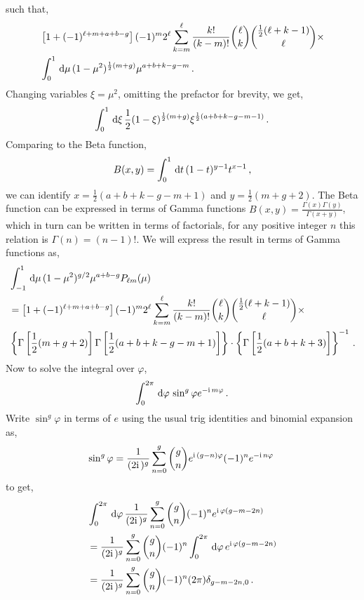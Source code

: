 such that, 
\begin{align}
	&\left[ 1 + (-1)^{\ell+m+a+b-g} \right] (-1)^m 2^\ell \sum_{k=m}^\ell \frac{k!}{(k-m)!} \binom{\ell}{k} \binom{\frac{1}{2}(\ell + k - 1)}{\ell} \times \nonumber \\
	&\int_0^1 \,\mathrm{d}\mu\, (1-\mu^2)^{\frac{1}{2}(m+g)} \mu^{a+b+k-g-m}\,.
\end{align}
Changing variables $\xi = \mu^2$, omitting the prefactor for brevity, we get, 
\begin{equation}
	\int_0^1\,\mathrm{d}\xi\, \frac{1}{2} (1 - \xi)^{\frac{1}{2}(m+g)} \xi^{\frac{1}{2}(a+b+k-g-m-1)}\,.
\end{equation}
Comparing to the Beta function, 
\begin{equation}
	B(x,y) = \int_0^1\,\mathrm{d} t\, (1-t)^{y-1} t^{x-1}\,,
\end{equation}
we can identify $x = \frac{1}{2}(a+b+k-g-m+1)$ and $y = \frac{1}{2}(m+g+2)$. The Beta function can be expressed in terms of Gamma functions $B(x,y) = \frac{\Gamma(x)\Gamma(y)}{\Gamma(x+y)}$, which in turn can be written in terms of factorials, for any positive integer $n$ this relation is $\Gamma(n) = (n-1)!$. We will express the result in terms of Gamma functions as, 
\begin{align}
	&\int_{-1}^{1}\,\mathrm{d}\mu\, (1-\mu^2)^{g/2} \mu^{a+b-g} P_{\ell m}(\mu) \nonumber \\
	&= \left[ 1 + (-1)^{\ell+m+a+b-g} \right] (-1)^m 2^\ell \sum_{k=m}^\ell \frac{k!}{(k-m)!} \binom{\ell}{k} \binom{\frac{1}{2}(\ell + k - 1)}{\ell} \times \nonumber \\
	& \left\{ \Gamma\left[\frac{1}{2}(m+g+2)\right] \Gamma\left[\frac{1}{2}(a+b+k-g-m+1)\right] \right\}\cdot\left\{ \Gamma\left[\frac{1}{2}(a+b+k+3) \right]\right\}^{-1}\,.
\end{align}
Now to solve the integral over $\varphi$, 
\begin{equation}
	\int_0^{2\pi}\,\mathrm{d}\varphi\, \sin^g\varphi e^{-\mathrm{i\,} m \varphi}\,.
\end{equation}
Write $\sin^g\varphi$ in terms of $e$ using the usual trig identities and binomial expansion as, 
\begin{equation}
	\sin^g\varphi = \frac{1}{(2\mathrm{i\,})^g} \sum_{n=0}^g \binom{g}{n} e^{\mathrm{i\,} (g-n) \varphi} (-1)^n e^{-\mathrm{i\,} n \varphi}\, 
\end{equation}
to get, 
\begin{align}
	&\int_0^{2\pi}\,\mathrm{d}\varphi\, \frac{1}{(2\mathrm{i\,})^g} \sum_{n=0}^g \binom{g}{n} (-1)^n e^{\mathrm{i\,} \varphi (g-m-2n)}\nonumber \\
	&= \frac{1}{(2\mathrm{i\,})^g} \sum_{n=0}^g \binom{g}{n} (-1)^n \int_0^{2\pi}\,\mathrm{d}\varphi\, e^{\mathrm{i\,} \varphi (g-m-2n)} \nonumber \\
	&= \frac{1}{(2\mathrm{i\,})^g} \sum_{n=0}^g \binom{g}{n} (-1)^n (2\pi) \delta_{g-m-2n, 0}\,.
\end{align}
